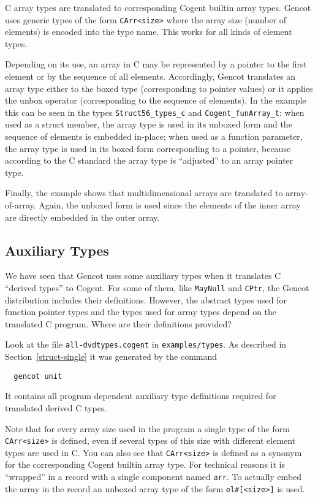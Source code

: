 \documentclass[a4paper]{report}
\newcommand{\code}[1]{\textnormal{\texttt{#1}}}
\begin{document}
C array types are translated to corresponding Cogent builtin array types. Gencot
uses generic types of the form \code{CArr<size>} where the array size (number of elements) is encoded into the type name.
This works for all kinds of element types.

Depending on its use, an array in C may be represented by a pointer to the first element or by the sequence of all elements.
Accordingly, Gencot translates an array type either to the boxed type (corresponding to pointer values) or it
applies the unbox operator (corresponding to the sequence of elements). In the example this can be seen in the types 
\code{Struct56\_types\_c} and \code{Cogent\_funArray\_t}: when used as a struct member, the array type is used in its unboxed
form and the sequence of elements is embedded in-place; when used as a function parameter, the array type is used in 
its boxed form corresponding to a pointer, because according to the C standard the array type is ``adjusted'' to an array
pointer type.

Finally, the example shows that multidimensional arrays are translated to array-of-array. Again, the unboxed form is used
since the elements of the inner array are directly embedded in the outer array.

\subsection{Auxiliary Types}
\label{types-auto-gen}

We have seen that Gencot uses some auxiliary types when it translates C ``derived types'' to Cogent. For some of them, like 
\code{MayNull} and \code{CPtr}, the Gencot distribution includes their definitions. However, the abstract types
used for function pointer types and the types used for array types depend on the translated C program. Where
are their definitions provided?

Look at the file \code{all-dvdtypes.cogent} in \code{examples/types}. As described in Section~\ref{struct-single} it was 
generated by the command
\begin{verbatim}
  gencot unit
\end{verbatim}
It contains all program dependent auxiliary type definitions required for translated derived C types. 

Note that for every array
size used in the program a single type of the form \code{CArr<size>} is defined, even if several types of this
size with different element types are used in C. You can also see that \code{CArr<size>} is defined as a synonym
for the corresponding Cogent builtin array type. For technical reasons it is ``wrapped'' in
a record with a single component named \code{arr}. To actually embed the array in the record an unboxed array type
of the form \code{el\#[<size>]} is used. 
\end{document}
